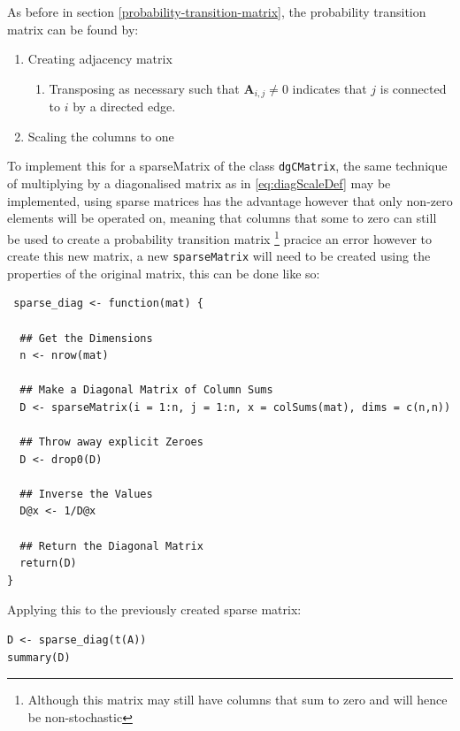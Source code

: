 \documentclass[11pt]{article}
\begin{document}
As before in section \ref{probability-transition-matrix}, the probability transition matrix can be found by:

\begin{enumerate}
\item Creating adjacency matrix
\begin{enumerate}
\item Transposing as necessary such that \(\mathbf{A}_{i,j}\neq 0\) indicates that \(j\) is connected to \(i\) by a directed edge.
\end{enumerate}
\item Scaling the columns to one
\end{enumerate}

To implement this for a sparseMatrix of the class \texttt{dgCMatrix}, the same
technique of multiplying by a diagonalised matrix as in \eqref{eq:diagScaleDef} may be
implemented, using sparse matrices has the advantage however that only non-zero
elements will be operated on, meaning that columns that some to zero can still
be used to create a probability transition matrix \footnote{Although this matrix may
still have columns that sum to zero and will hence be non-stochastic}
pracice an error however to create this new matrix, a new \texttt{sparseMatrix} will
need to be created using the properties of the original matrix, this can be done
like so:

\begin{listing}[htbp]
\begin{verbatim}
 sparse_diag <- function(mat) {

  ## Get the Dimensions
  n <- nrow(mat)

  ## Make a Diagonal Matrix of Column Sums
  D <- sparseMatrix(i = 1:n, j = 1:n, x = colSums(mat), dims = c(n,n))

  ## Throw away explicit Zeroes
  D <- drop0(D)

  ## Inverse the Values
  D@x <- 1/D@x

  ## Return the Diagonal Matrix
  return(D)
}
\end{verbatim}
\caption{\label{sparse-diag}A function that takes in a column \(\rightarrow\) row adjacency matrix (\(\mathbf{A}\)) and returns a diagonal matrix (\(\mathbf{D}^{-1}_{\mathbf{A}}}\)) such that \(\vec{1}\mathbf{A} \mathbf{D}^{-1}_{\mathbf{A}} = \vec{1}\)}
\end{listing}

Applying this to the previously created sparse matrix:

\begin{verbatim}
D <- sparse_diag(t(A))
summary(D)
\end{verbatim}
\end{document}
